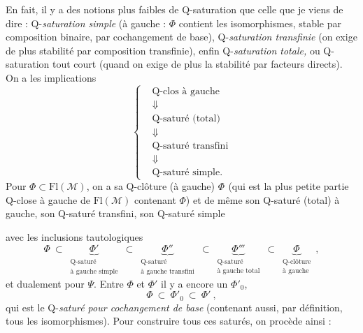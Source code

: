 \documentclass[11pt]{article}
\newcommand{\printedpage}[1]{\marginpar{\footnotesize p.~#1}}
\newcommand{\msp}[1]{\marginpar{\footnotesize [#1]}}
\newcommand{\tld}{\tilde{}}   %
\begin{document}
En fait, il y a des notions plus faibles de Q-saturation que celle que je viens de dire : Q-\textit{saturation simple} (à gauche : $\Phi$ contient les isomorphismes, stable par composition binaire, par cochangement de base), Q-\textit{saturation transfinie} (on exige de plus stabilité par composition transfinie), enfin Q-\textit{saturation totale,} ou Q-saturation tout court (quand on exige de plus la stabilité par facteurs directs). On a les implications
\[
\left\{
\begin{aligned}
&\text{Q-clos à gauche}\\
&\Downarrow\\
&\text{Q-saturé (total)}\\
&\Downarrow\\
&\text{Q-saturé transfini}\\
&\Downarrow\\
&\text{Q-saturé simple.}
\end{aligned}
\right.
\tag*{(1.6)}
\]
Pour $\Phi \subset \mathrm{Fl}(\mathcal{M})$, on a sa Q-clôture (à gauche) $\Phi^{\tld}$ (qui est la plus petite partie Q-close à gauche de $\mathrm{Fl}(\mathcal{M})$ contenant $\Phi$) et de même son Q-saturé (total) à gauche, son Q-saturé transfini, son Q-saturé simple

\msp{page 4}

avec les inclusions tautologiques
\[
\Phi \ \subset \
\underbrace{\Phi'}_{\substack{\text{Q-saturé}\\ \text{à gauche simple}}}
\ \subset \
\underbrace{\Phi''}_{\substack{\text{Q-saturé}\\ \text{à gauche transfini}}}
\ \subset \
\underbrace{\Phi'''}_{\substack{\text{Q-saturé}\\ \text{à gauche total}}}
\ \subset \
\underbrace{\Phi^{\tld}}_{\substack{\text{Q-clôture}\\ \text{à gauche}}}
\ ,
\tag*{(1.7)}
\]
et dualement pour $\Psi$. Entre $\Phi$ et $\Phi'$ il y a encore un $\Phi'_0$,
\[
\Phi \ \subset \ \Phi'_0 \ \subset \ \Phi'\ ,
\tag*{(1.8)}
\]
qui est le Q-\textit{saturé pour cochangement de base} (contenant aussi, par définition, tous les isomorphismes). Pour construire tous ces saturés, on procède ainsi :

\newpage

\printedpage{3}
\end{document}
